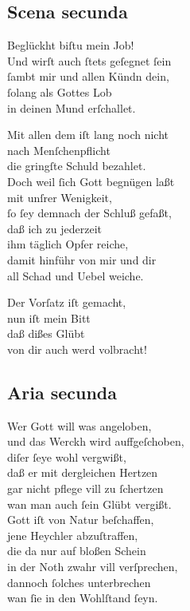 \documentclass{ees}
\newenvironment{lyrics}[1]{%
  \subsection{#1}\nopagebreak%
  \begin{lyricslist}%
  \let\voice\item%
}{%
  \end{lyricslist}%
}
\begin{document}
\begin{lyrics}{Scena secunda}
  \voice[Jobs Frau]
  Beglückht biſtu mein Job!\\
  Und wirſt auch ſtets geſegnet ſein\\
  ſambt mir und allen Kündn dein,\\
  ſolang als Gottes Lob\\
  in deinen Mund erſchallet.

  \voice[Job]
  Mit allen dem iſt lang noch nicht\\
  nach Menſchenpflicht\\
  die gringſte Schuld bezahlet.\\
  Doch weil ſich Gott begnügen laßt\\
  mit unſrer Wenigkeit,\\
  ſo ſey demnach der Schluß gefaßt,\\
  daß ich zu jederzeit\\
  ihm täglich Opfer reiche,\\
  damit hinführ von mir und dir\\
  all Schad und Uebel weiche.

  \voice[Jobs Frau]
  Der Vorſatz iſt gemacht,\\
  nun iſt mein Bitt\\
  daß dißes Glübt\\
  von dir auch werd volbracht!
\end{lyrics}

\begin{lyrics}{Aria secunda}
  \voice[Jobs Frau]
  Wer Gott will was angeloben,\\
  und das Werckh wird auffgeſchoben,\\
  diſer ſeye wohl vergwißt,\\
  daß er mit dergleichen Hertzen\\
  gar nicht pflege vill zu ſchertzen\\
  wan man auch ſein Glübt vergißt.\\[1ex]
  Gott iſt von Natur beſchaffen,\\
  jene Heychler abzuſtraffen,\\
  die da nur auf bloßen Schein\\
  in der Noth zwahr vill verſprechen,\\
  dannoch ſolches unterbrechen\\
  wan ſie in den Wohlſtand ſeyn.
\end{lyrics}
\end{document}
